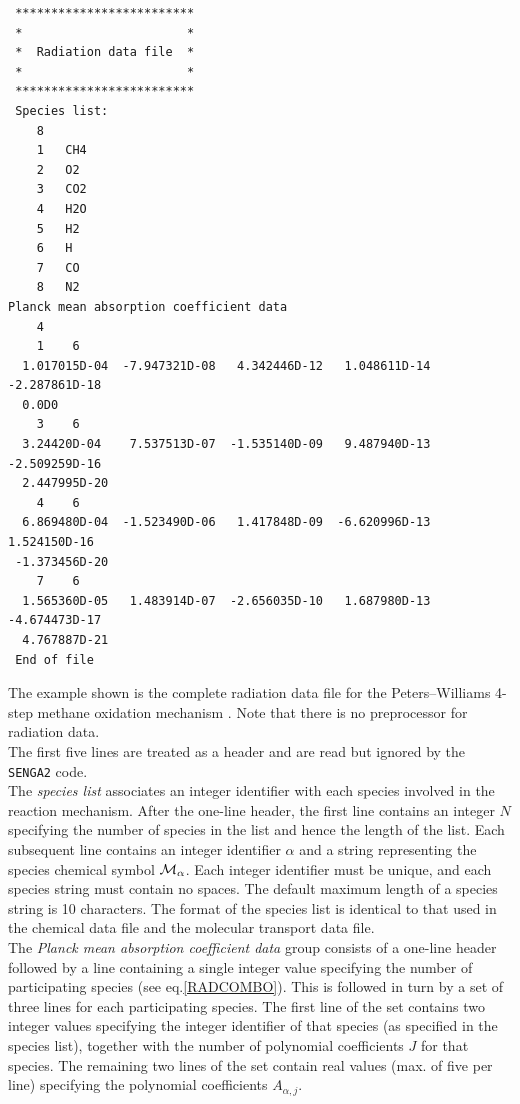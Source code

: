 \documentclass[dvips]{article}
\begin{document}
\begin{verbatim}
 *************************
 *                       *
 *  Radiation data file  *
 *                       *
 *************************
 Species list:
    8
    1   CH4       
    2   O2        
    3   CO2       
    4   H2O       
    5   H2        
    6   H         
    7   CO        
    8   N2        
Planck mean absorption coefficient data
    4
    1    6
  1.017015D-04  -7.947321D-08   4.342446D-12   1.048611D-14   -2.287861D-18
  0.0D0
    3    6
  3.24420D-04    7.537513D-07  -1.535140D-09   9.487940D-13   -2.509259D-16
  2.447995D-20
    4    6
  6.869480D-04  -1.523490D-06   1.417848D-09  -6.620996D-13    1.524150D-16
 -1.373456D-20
    7    6
  1.565360D-05   1.483914D-07  -2.656035D-10   1.687980D-13   -4.674473D-17
  4.767887D-21
 End of file
\end{verbatim}
The example shown is the complete radiation data file for the 
Peters--Williams 4-step methane oxidation mechanism \cite{PW87}.  Note
that there is no preprocessor for radiation data.\\

\noindent
The first five lines are treated as a header and are read but ignored by
the {\tt SENGA2} code.\\

\noindent
The {\it species list} associates an integer identifier with each species
involved in the reaction mechanism.  After the one-line header, the
first line contains an integer $N$ specifying the number of species in the
list and hence the length of the list.  Each subsequent line contains an
integer identifier $\alpha$ and a
string representing the species chemical symbol ${\cal M}_{\alpha}$.
Each integer identifier must be unique, and each species string must contain
no spaces.  The default maximum length of a species string is 10 characters.
The format of the species list is identical to that used in the chemical data
file and the molecular transport data file.\\

\noindent
The {\it Planck mean absorption coefficient data} group consists of a one-line
header followed by a line containing a single integer value specifying
the number of participating species (see eq.\ref{RADCOMBO}).  This is followed
in turn
by a set of three lines for each participating species.  The first line of the
set contains two integer values specifying the integer identifier of
that species (as specified in the species list), together with the number of
polynomial coefficients $J$ for that species.  The remaining two lines of
the set contain real values (max. of five per line) specifying the polynomial
coefficients $A_{\alpha,j}$.\\
\end{document}
